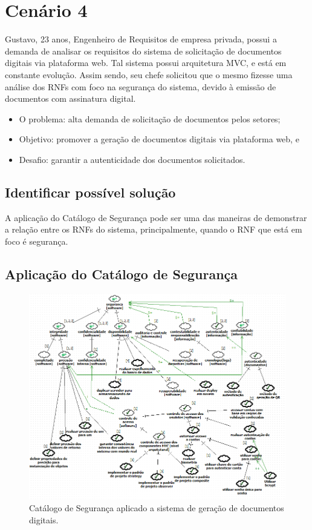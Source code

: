 \section{Cenário 4}
\label{subsec:persona4}

Gustavo, 23 anos, Engenheiro de Requisitos de empresa privada, possui a demanda de analisar os requisitos do sistema de solicitação de documentos digitais via plataforma web. Tal sistema possui arquitetura MVC, e está em constante evolução. Assim sendo, seu chefe solicitou que o mesmo fizesse uma análise dos RNFs com foco na segurança do sistema, devido à emissão de documentos com assinatura digital. 

\begin{itemize}
	\item O problema: alta demanda de solicitação de documentos pelos setores; 
	\item Objetivo: promover a geração de documentos digitais via plataforma web, e
	\item Desafio: garantir a autenticidade dos documentos solicitados.
\end{itemize}

\subsection{Identificar possível solução}

A aplicação do Catálogo de Segurança pode ser uma das maneiras de demonstrar a relação entre os RNFs do sistema, principalmente, quando o RNF que está em foco é segurança.


\subsection{Aplicação do Catálogo de Segurança}

\begin{figure}[h!]
	\centering
	\includegraphics[keepaspectratio=true,scale=0.75]{figuras/catalogoPersona4.PNG}
	\caption{Catálogo de Segurança aplicado a sistema de geração de documentos digitais.}
	\label{catalogoPersona4}
\end{figure}

